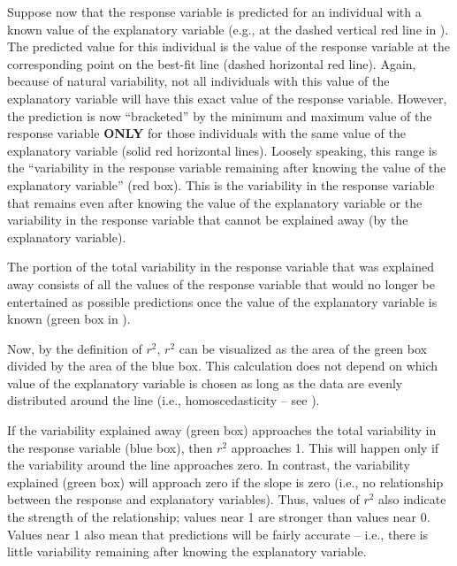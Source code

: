 \documentclass[10pt,openany]{book}\usepackage[]{graphicx}\usepackage[]{color}
\begin{document}
Suppose now that the response variable is predicted for an individual with a known value of the explanatory variable (e.g., at the dashed vertical red line in ). The predicted value for this individual is the value of the response variable at the corresponding point on the best-fit line (dashed horizontal red line). Again, because of natural variability, not all individuals with this value of the explanatory variable will have this exact value of the response variable. However, the prediction is now ``bracketed'' by the minimum and maximum value of the response variable \textbf{ONLY} for those individuals with the same value of the explanatory variable (solid red horizontal lines). Loosely speaking, this range is the ``variability in the response variable remaining after knowing the value of the explanatory variable'' (red box). This is the variability in the response variable that remains even after knowing the value of the explanatory variable or the variability in the response variable that cannot be explained away (by the explanatory variable).

The portion of the total variability in the response variable that was explained away consists of all the values of the response variable that would no longer be entertained as possible predictions once the value of the explanatory variable is known (green box in ).

Now, by the definition of $r^{2}$, $r^{2}$ can be visualized as the area of the green box divided by the area of the blue box. This calculation does not depend on which value of the explanatory variable is chosen as long as the data are evenly distributed around the line (i.e., homoscedasticity -- see ).

If the variability explained away (green box) approaches the total variability in the response variable (blue box), then $r^{2}$ approaches 1. This will happen only if the variability around the line approaches zero. In contrast, the variability explained (green box) will approach zero if the slope is zero (i.e., no relationship between the response and explanatory variables). Thus, values of $r^{2}$ also indicate the strength of the relationship; values near 1 are stronger than values near 0. Values near 1 also mean that predictions will be fairly accurate -- i.e., there is little variability remaining after knowing the explanatory variable.

\end{document}
